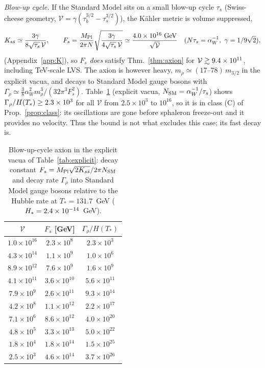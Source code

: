 \documentclass[11pt]{article}
\newcommand{\MP}{M_{\rm Pl}}
\begin{document}
\emph{Blow-up cycle.} If the Standard Model sits on a small blow-up cycle $\tau_s$ (Swiss-cheese geometry, $\mathcal V=\gamma(\tau_b^{3/2}-\tau_s^{3/2})$), the Kähler metric is volume suppressed,
\begin{equation}
K_{s\bar s}\simeq\frac{3\gamma}{8\sqrt{\tau_s}\,\mathcal V},\qquad F_s=\frac{\MP}{2\pi N}\sqrt{\frac{3\gamma}{4\sqrt{\tau_s}\,\mathcal V}}\simeq\frac{\FsCoef~\text{GeV}}{\sqrt{\mathcal V}}\quad(N\tau_s=\alpha_W^{-1},\ \gamma=1/9\sqrt2),
\end{equation}
(Appendix~\ref{app:K}), so $F_s$ \emph{does} satisfy Thm.~\ref{thm:axion} for $\mathcal V\gtrsim9.4\times10^{11}$, including TeV-scale LVS. The axion is however heavy, $m_\rho\simeq(17\text{--}78)\,m_{3/2}$ in the explicit vacua, and decays to Standard Model gauge bosons with $\Gamma_\rho\simeq\tfrac38\alpha_W^2m_\rho^3/(32\pi^3F_s^2)$. Table~\ref{tab:fs} (explicit vacua, $N_{\rm SM}=\alpha_W^{-1}/\tau_s$) shows $\Gamma_\rho/H(T_*)\ge2.3\times10^{3}$ for all $\mathcal V$ from $2.5\times10^3$ to $10^{16}$, so it is in class (C) of Prop.~\ref{prop:class}: its oscillations are gone before sphaleron freeze-out and it provides no velocity. Thus the bound is not what excludes this case; its fast decay is.
\begin{table}[t]
\centering
\begin{tabular}{c|cc}
\toprule
$\mathcal V$ & $F_s$ [GeV] & $\Gamma_\rho/H(T_*)$\\
\midrule
$1.0\times10^{16}$ & $2.3\times10^{8}$ & $2.3\times10^{3}$ \\
$4.3\times10^{14}$ & $1.1\times10^{9}$ & $1.0\times10^{6}$ \\
$8.9\times10^{12}$ & $7.6\times10^{9}$ & $1.6\times10^{9}$ \\
$4.1\times10^{11}$ & $3.6\times10^{10}$ & $5.6\times10^{11}$ \\
$7.9\times10^{9}$ & $2.6\times10^{11}$ & $9.3\times10^{14}$ \\
$4.2\times10^{8}$ & $1.1\times10^{12}$ & $2.2\times10^{17}$ \\
$7.1\times10^{6}$ & $8.6\times10^{12}$ & $4.0\times10^{20}$ \\
$4.8\times10^{5}$ & $3.3\times10^{13}$ & $5.0\times10^{22}$ \\
$1.8\times10^{4}$ & $1.8\times10^{14}$ & $1.5\times10^{25}$ \\
$2.5\times10^{3}$ & $4.6\times10^{14}$ & $3.7\times10^{26}$ \\
\bottomrule
\end{tabular}
\caption{Blow-up-cycle axion in the explicit vacua of Table~\ref{tab:explicit}: decay constant $F_s=\MP\sqrt{2K_{s\bar s}}/2\pi N_{\rm SM}$ and decay rate $\Gamma_\rho$ into Standard Model gauge bosons relative to the Hubble rate at $T_*=131.7$~GeV ($H_*=2.4\times10^{-14}$~GeV).}\label{tab:fs}
\end{table}
\end{document}
